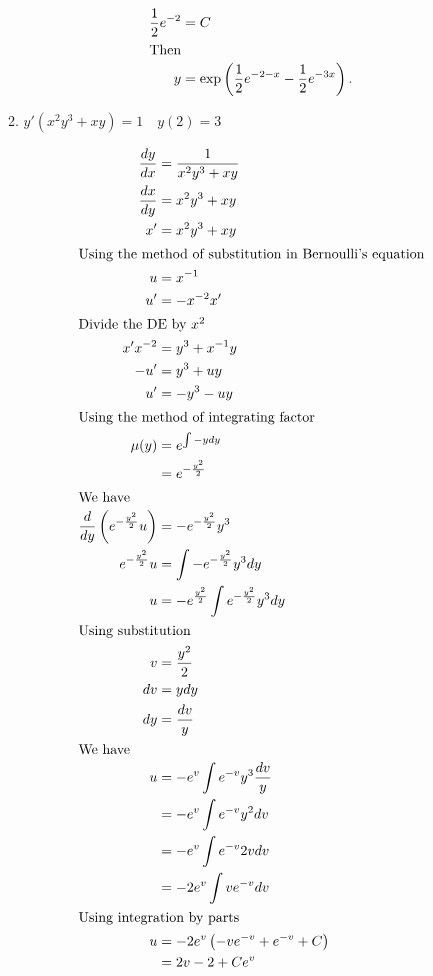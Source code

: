 \documentclass{zc-ust-hw}
\begin{document}
\begin{enumerate}
\begin{enumerate}
\begin{sol}
\begin{align}
            \frac{1}{2}e^{-2}&=C\\
            \intertext{Then}
            y&=\exp \left( \frac{1}{2}e^{-2-x}-\frac{1}{2}e^{-3x} \right)
          .\end{align}
        \end{sol}
      \item $y'\left(x^2 y^3+x y\right)=1 \quad y(2)=3 $
        \begin{sol}
          \begin{align}
            \frac{dy}{dx}&=\frac{1}{x^2 y^3+xy}\\
            \frac{dx}{dy}&=x^2 y^3+xy\\
            x'&=x^2 y^3+xy\\
            \intertext{Using the method of substitution in Bernoulli's equation}
            u&=x^{-1}\\
            u'&=-x^{-2}x'\\
            \intertext{Divide the DE by $x^2$}
            x'x^{-2}&=y^3+x^{-1}y\\
            -u'&=y^3+uy\\
            u'&=-y^3-uy\\
            \intertext{Using the method of integrating factor}
            \mu(y)&=e^{\int -y dy}\\
                  &=e^{-\frac{y^2}{2}}\\
                  \intertext{We have}
            \frac{d}{dy}\left(e^{-\frac{y^2}{2}}u\right)&=-e^{-\frac{y^2}{2}}y^3\\
            e^{-\frac{y^2}{2}}u&=\int -e^{-\frac{y^2}{2}}y^3 dy\\
            u&=-e^{\frac{y^2}{2}} \int e^{-\frac{y^2}{2}}y^3 dy\\
            \intertext{Using substitution}
            v&=\frac{y^2}{2}\\
            dv&=y dy\\
            dy&=\frac{dv}{y}\\
            \intertext{We have}
            u&=-e^v \int e^{-v}  y^3 \frac{dv}{y}\\
             &= -e^v \int e^{-v} y^2 dv\\
             &= -e^v \int e^{-v} 2v dv\\
             &= -2e^v \int ve^{-v}  dv\\
             \intertext{Using integration by parts}
            u &= -2e^{v}\left( -ve^{-v} + e^{-v} + C \right)\\
              &= 2v - 2 + Ce^{v}\\

\end{align}
\end{sol}
\end{enumerate}
\end{enumerate}
\end{document}

